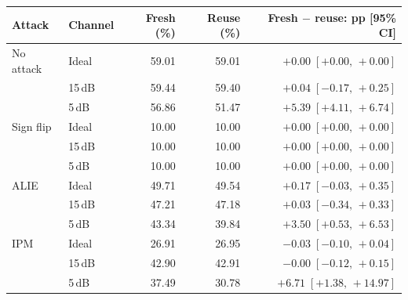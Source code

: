\begin{tabular}{@{}llrrr@{}}
\toprule
Attack & Channel & Fresh (\%) & Reuse (\%) & Fresh $-$ reuse: pp [95\% CI] \\
\midrule
No attack & Ideal & 59.01 & 59.01 & $+0.00\;[+0.00,\,+0.00]$ \\
 & 15\,dB & 59.44 & 59.40 & $+0.04\;[-0.17,\,+0.25]$ \\
 & 5\,dB & 56.86 & 51.47 & $+5.39\;[+4.11,\,+6.74]$ \\
\midrule
Sign flip & Ideal & 10.00 & 10.00 & $+0.00\;[+0.00,\,+0.00]$ \\
 & 15\,dB & 10.00 & 10.00 & $+0.00\;[+0.00,\,+0.00]$ \\
 & 5\,dB & 10.00 & 10.00 & $+0.00\;[+0.00,\,+0.00]$ \\
\midrule
ALIE & Ideal & 49.71 & 49.54 & $+0.17\;[-0.03,\,+0.35]$ \\
 & 15\,dB & 47.21 & 47.18 & $+0.03\;[-0.34,\,+0.33]$ \\
 & 5\,dB & 43.34 & 39.84 & $+3.50\;[+0.53,\,+6.53]$ \\
\midrule
IPM & Ideal & 26.91 & 26.95 & $-0.03\;[-0.10,\,+0.04]$ \\
 & 15\,dB & 42.90 & 42.91 & $-0.00\;[-0.12,\,+0.15]$ \\
 & 5\,dB & 37.49 & 30.78 & $+6.71\;[+1.38,\,+14.97]$ \\
\bottomrule
\end{tabular}
